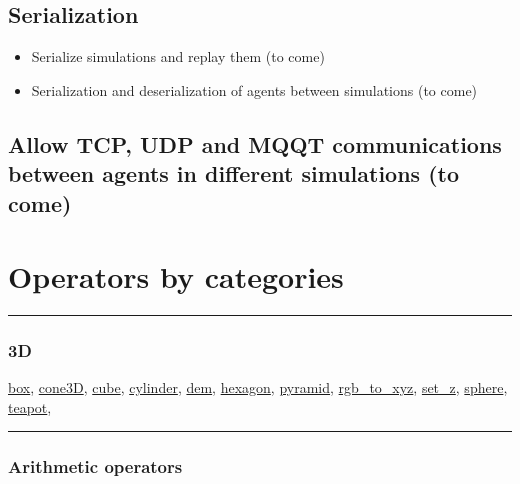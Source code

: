 \documentclass[]{book}
\providecommand{\tightlist}{%
  \setlength{\itemsep}{0pt}\setlength{\parskip}{0pt}}
\theoremstyle{definition}
\theoremstyle{definition}
\theoremstyle{definition}
\theoremstyle{remark}
\begin{document}
\section{Serialization}\label{serialization}

\begin{itemize}
\tightlist
\item
  Serialize simulations and replay them (to come)
\item
  Serialization and deserialization of agents between simulations (to
  come)
\end{itemize}

\section{Allow TCP, UDP and MQQT communications between agents in
different simulations (to
come)}\label{allow-tcp-udp-and-mqqt-communications-between-agents-in-different-simulations-to-come}

\chapter{Operators by categories}\label{operators-by-categories}

\begin{center}\rule{0.5\linewidth}{\linethickness}\end{center}

\subsection{3D}\label{d}

\href{operators-b-to-c.html\#box}{box},
\href{operators-b-to-c.html\#cone3d}{cone3D},
\href{operators-b-to-c.html\#cube}{cube},
\href{operators-b-to-c.html\#cylinder}{cylinder},
\href{operators-d-to-h.html\#dem}{dem},
\href{operators-d-to-h.html\#hexagon}{hexagon},
\href{operators-n-to-r.html\#pyramid}{pyramid},
\href{operators-n-to-r.html\#rgb_to_xyz}{rgb\_to\_xyz},
\href{operators-s-to-z.html\#set_z}{set\_z},
\href{operators-s-to-z.html\#sphere}{sphere},
\href{operators-s-to-z.html\#teapot}{teapot},

\begin{center}\rule{0.5\linewidth}{\linethickness}\end{center}

\subsection{Arithmetic operators}\label{arithmetic-operators}
\end{document}

